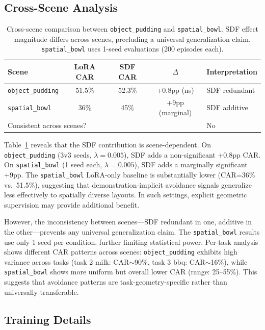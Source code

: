 \documentclass[letterpaper]{article}
\begin{document}
\subsection{Cross-Scene Analysis}

\begin{table}[t]
\centering
\caption{Cross-scene comparison between \texttt{object\_pudding} and \texttt{spatial\_bowl}. SDF effect magnitude differs across scenes, precluding a universal generalization claim. \texttt{spatial\_bowl} uses 1-seed evaluations (200 episodes each).}
\label{tab:cross_scene}
\begin{tabular}{lcccl}
\toprule
\textbf{Scene} & \textbf{LoRA CAR} & \textbf{SDF CAR} & \textbf{$\Delta$} & \textbf{Interpretation} \\
\midrule
\texttt{object\_pudding} & 51.5\% & 52.3\% & +0.8pp (ns) & SDF redundant \\
\texttt{spatial\_bowl} & 36\% & 45\% & +9pp (marginal) & SDF additive \\
\midrule
\multicolumn{4}{l}{Consistent across scenes?} & No \\
\bottomrule
\end{tabular}
\end{table}

Table~\ref{tab:cross_scene} reveals that the SDF contribution is scene-dependent. On \texttt{object\_pudding} (3v3 seeds, $\lambda=0.005$), SDF adds a non-significant +0.8pp CAR. On \texttt{spatial\_bowl} (1 seed each, $\lambda=0.005$), SDF adds a marginally significant +9pp. The \texttt{spatial\_bowl} LoRA-only baseline is substantially lower (CAR=36\% vs.\ 51.5\%), suggesting that demonstration-implicit avoidance signals generalize less effectively to spatially diverse layouts. In such settings, explicit geometric supervision may provide additional benefit.

However, the inconsistency between scenes---SDF redundant in one, additive in the other---prevents any universal generalization claim. The \texttt{spatial\_bowl} results use only 1 seed per condition, further limiting statistical power. Per-task analysis shows different CAR patterns across scenes: \texttt{object\_pudding} exhibits high variance across tasks (task 2 milk: CAR$\sim$90\%, task 3 bbq: CAR$\sim$16\%), while \texttt{spatial\_bowl} shows more uniform but overall lower CAR (range: 25--55\%). This suggests that avoidance patterns are task-geometry-specific rather than universally transferable.


\subsection{Training Details}
\end{document}
